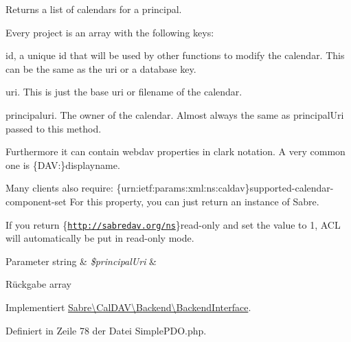Returns a list of calendars for a principal.

Every project is an array with the following keys\+:
\begin{DoxyItemize}
\item id, a unique id that will be used by other functions to modify the calendar. This can be the same as the uri or a database key.
\item uri. This is just the \textquotesingle{}base uri\textquotesingle{} or \textquotesingle{}filename\textquotesingle{} of the calendar.
\item principaluri. The owner of the calendar. Almost always the same as principal\+Uri passed to this method.
\end{DoxyItemize}

Furthermore it can contain webdav properties in clark notation. A very common one is \textquotesingle{}\{D\+AV\+:\}displayname\textquotesingle{}.

Many clients also require\+: \{urn\+:ietf\+:params\+:xml\+:ns\+:caldav\}supported-\/calendar-\/component-\/set For this property, you can just return an instance of Sabre.

If you return \{\href{http://sabredav.org/ns}{\tt http\+://sabredav.\+org/ns}\}read-\/only and set the value to 1, A\+CL will automatically be put in read-\/only mode.


\begin{DoxyParams}[1]{Parameter}
string & {\em \$principal\+Uri} & \\
\hline
\end{DoxyParams}
\begin{DoxyReturn}{Rückgabe}
array 
\end{DoxyReturn}


Implementiert \mbox{\hyperlink{interface_sabre_1_1_cal_d_a_v_1_1_backend_1_1_backend_interface_a41d069c48af0155b8e6e04bee46c70ba}{Sabre\textbackslash{}\+Cal\+D\+A\+V\textbackslash{}\+Backend\textbackslash{}\+Backend\+Interface}}.



Definiert in Zeile 78 der Datei Simple\+P\+D\+O.\+php.

\mbox{\label{class_sabre_1_1_cal_d_a_v_1_1_backend_1_1_simple_p_d_o_ae2b17157379fdb4720f51fb63d895e48}} 
